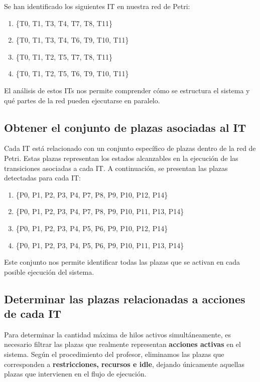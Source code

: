 \documentclass[12pt]{article}
\begin{document}
Se han identificado los siguientes IT en nuestra red de Petri:

\begin{enumerate}
    \item \{T0, T1, T3, T4, T7, T8, T11\}
    \item \{T0, T1, T3, T4, T6, T9, T10, T11\}
    \item \{T0, T1, T2, T5, T7, T8, T11\}
    \item \{T0, T1, T2, T5, T6, T9, T10, T11\}
\end{enumerate}

El análisis de estos ITs nos permite comprender cómo se estructura el sistema y qué partes de la red pueden ejecutarse en paralelo.

\subsection{Obtener el conjunto de plazas asociadas al IT}

Cada IT está relacionado con un conjunto específico de plazas dentro de la red de Petri. Estas plazas representan los estados alcanzables en la ejecución de las transiciones asociadas a cada IT. A continuación, se presentan las plazas detectadas para cada IT:

\begin{enumerate}
    \item \{P0, P1, P2, P3, P4, P7, P8, P9, P10, P12, P14\}
    \item \{P0, P1, P2, P3, P4, P7, P8, P9, P10, P11, P13, P14\}
    \item \{P0, P1, P2, P3, P4, P5, P6, P9, P10, P12, P14\}
    \item \{P0, P1, P2, P3, P4, P5, P6, P9, P10, P11, P13, P14\}
\end{enumerate}

Este conjunto nos permite identificar todas las plazas que se activan en cada posible ejecución del sistema.

\subsection{Determinar las plazas relacionadas a acciones de cada IT}

Para determinar la cantidad máxima de hilos activos simultáneamente, es necesario filtrar las plazas que realmente representan \textbf{acciones activas} en el sistema. Según el procedimiento del profesor, eliminamos las plazas que corresponden a \textbf{restricciones, recursos e idle}, dejando únicamente aquellas plazas que intervienen en el flujo de ejecución.
\end{document}
